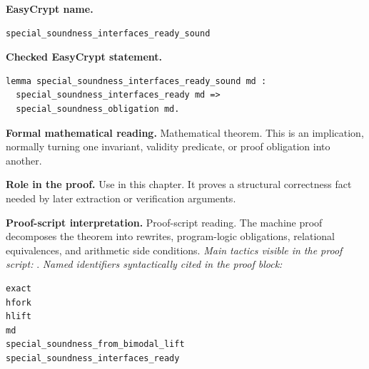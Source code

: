 \begin{formaltheorem}
\noindent\textbf{EasyCrypt name.}
\begin{lstlisting}[language=EasyCrypt,basicstyle=\ttfamily\scriptsize]
special_soundness_interfaces_ready_sound
\end{lstlisting}
\noindent\textbf{Checked EasyCrypt statement.}
\begin{lstlisting}[language=EasyCrypt,basicstyle=\ttfamily\scriptsize]
lemma special_soundness_interfaces_ready_sound md :
  special_soundness_interfaces_ready md =>
  special_soundness_obligation md.
\end{lstlisting}
\noindent\textbf{Formal mathematical reading.}
Mathematical theorem. This is an implication, normally turning one invariant, validity predicate, or proof obligation into another.

\noindent\textbf{Role in the proof.}
Use in this chapter. It proves a structural correctness fact needed by later extraction or verification arguments.

\noindent\textbf{Proof-script interpretation.}
Proof-script reading. The machine proof decomposes the theorem into rewrites, program-logic obligations, relational equivalences, and arithmetic side conditions.
\emph{Main tactics visible in the proof script:} .
\emph{Named identifiers syntactically cited in the proof block:}
\begin{lstlisting}[language=EasyCrypt,basicstyle=\ttfamily\scriptsize]
exact
hfork
hlift
md
special_soundness_from_bimodal_lift
special_soundness_interfaces_ready
\end{lstlisting}

\end{formaltheorem}

